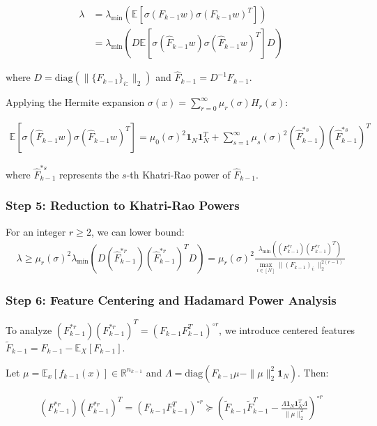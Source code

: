 \documentclass{article}
\newcommand{\E}{\mathbb{E}}
\newcommand{\R}{\mathbb{R}}
\newcommand{\evmin}[1]{\lambda_{\min}\left(#1\right)}
\begin{document}
\begin{align}
\lambda &= \evmin{\E[\sigma(F_{k-1}w)\sigma(F_{k-1}w)^T]} \\
&= \evmin{D \E[\sigma(\hat{F}_{k-1}w)\sigma(\hat{F}_{k-1}w)^T] D}
\end{align}

where $D = \text{diag}(\|\{F_{k-1}\}_{i:}\|_2)$ and $\hat{F}_{k-1} = D^{-1}F_{k-1}$.

Applying the Hermite expansion $\sigma(x) = \sum_{r=0}^{\infty} \mu_r(\sigma) H_r(x)$:

\begin{align}
\E[\sigma(\hat{F}_{k-1}w)\sigma(\hat{F}_{k-1}w)^T] = \mu_0(\sigma)^2 \mathbf{1}_N \mathbf{1}_N^T + \sum_{s=1}^{\infty} \mu_s(\sigma)^2 (\hat{F}_{k-1}^{*s})(\hat{F}_{k-1}^{*s})^T
\end{align}

where $\hat{F}_{k-1}^{*s}$ represents the $s$-th Khatri-Rao power of $\hat{F}_{k-1}$.

\subsubsection{Step 5: Reduction to Khatri-Rao Powers}

For an integer $r \geq 2$, we can lower bound:
\begin{align}
\lambda \geq \mu_r(\sigma)^2 \evmin{D(\hat{F}_{k-1}^{*r})(\hat{F}_{k-1}^{*r})^T D} = \mu_r(\sigma)^2 \frac{\evmin{(F_{k-1}^{*r})(F_{k-1}^{*r})^T}}{\max_{i \in [N]} \|(F_{k-1})_{i:}\|_2^{2(r-1)}}
\end{align}

\subsubsection{Step 6: Feature Centering and Hadamard Power Analysis}

To analyze $(F_{k-1}^{*r})(F_{k-1}^{*r})^T = (F_{k-1}F_{k-1}^T)^{\circ r}$, we introduce centered features $\tilde{F}_{k-1} = F_{k-1} - \E_X[F_{k-1}]$. 

Let $\mu = \E_x[f_{k-1}(x)] \in \R^{n_{k-1}}$ and $\Lambda = \text{diag}(F_{k-1}\mu - \|\mu\|_2^2 \mathbf{1}_N)$. Then:

\begin{align}
(F_{k-1}^{*r})(F_{k-1}^{*r})^T = (F_{k-1}F_{k-1}^T)^{\circ r} \succeq \left(\tilde{F}_{k-1}\tilde{F}_{k-1}^T - \frac{\Lambda \mathbf{1}_N \mathbf{1}_N^T \Lambda}{\|\mu\|_2^2}\right)^{\circ r}
\end{align}
\end{document}
